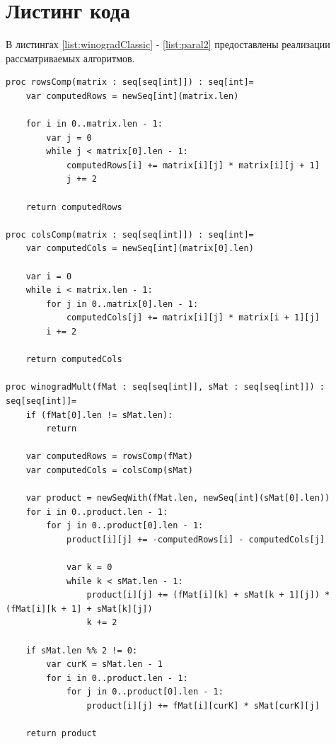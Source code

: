 \documentclass[12pt]{report}
\begin{document}
\section{Листинг кода}
В листингах \ref{list:winogradClassic} - \ref{list:paral2} предоставлены реализации рассматриваемых алгоритмов.
\begin{lstlisting}[caption=Алгоритм Копперсмита-Винограда в последовательной реализации,
label={list:winogradClassic}]
proc rowsComp(matrix : seq[seq[int]]) : seq[int]=
    var computedRows = newSeq[int](matrix.len)

    for i in 0..matrix.len - 1:
        var j = 0
        while j < matrix[0].len - 1:
            computedRows[i] += matrix[i][j] * matrix[i][j + 1]
            j += 2

    return computedRows

proc colsComp(matrix : seq[seq[int]]) : seq[int]=
    var computedCols = newSeq[int](matrix[0].len)

    var i = 0
    while i < matrix.len - 1:
        for j in 0..matrix[0].len - 1:
            computedCols[j] += matrix[i][j] * matrix[i + 1][j]
        i += 2

    return computedCols

proc winogradMult(fMat : seq[seq[int]], sMat : seq[seq[int]]) : seq[seq[int]]=
    if (fMat[0].len != sMat.len):
        return

    var computedRows = rowsComp(fMat)
    var computedCols = colsComp(sMat)

    var product = newSeqWith(fMat.len, newSeq[int](sMat[0].len))
    for i in 0..product.len - 1:
        for j in 0..product[0].len - 1:
            product[i][j] += -computedRows[i] - computedCols[j]

            var k = 0
            while k < sMat.len - 1:
                product[i][j] += (fMat[i][k] + sMat[k + 1][j]) * (fMat[i][k + 1] + sMat[k][j])
                k += 2

    if sMat.len %% 2 != 0:
        var curK = sMat.len - 1
        for i in 0..product.len - 1:
            for j in 0..product[0].len - 1:
                product[i][j] += fMat[i][curK] * sMat[curK][j]

    return product
\end{lstlisting}
\end{document}

